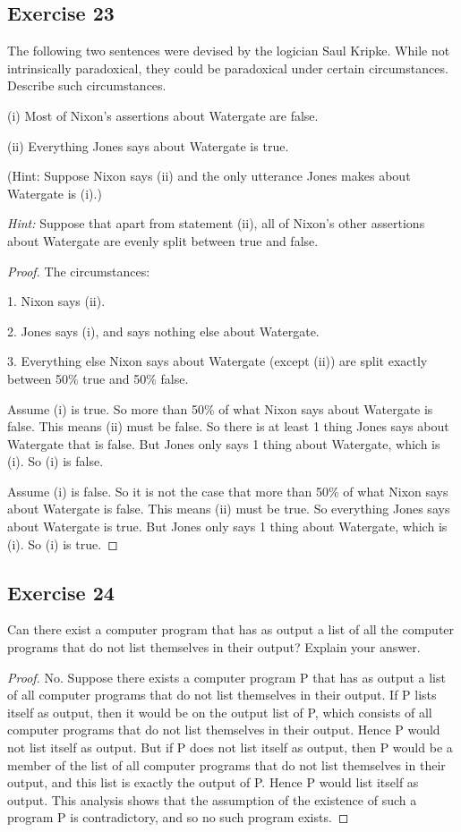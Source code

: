 \documentclass[14pt]{extarticle}
\begin{document}
\subsection{Exercise 23}
The following two sentences were devised by the logician Saul Kripke. While not intrinsically paradoxical, they 
could be paradoxical under certain circumstances. Describe such circumstances.

(i) Most of Nixon’s assertions about Watergate are false.

(ii) Everything Jones says about Watergate is true.

(Hint: Suppose Nixon says (ii) and the only utterance Jones makes about Watergate is (i).)

{\it Hint:} Suppose that apart from statement (ii), all of
Nixon’s other assertions about Watergate are evenly split 
between true and false.

\begin{proof}
The circumstances:

1. Nixon says (ii).

2. Jones says (i), and says nothing else about Watergate.

3. Everything else Nixon says about Watergate (except (ii)) are split exactly between 50\% true and 50\% false.

Assume (i) is true. So more than 50\% of what Nixon says about Watergate is false. This means (ii) must be false.
So there is at least 1 thing Jones says about Watergate that is false. But Jones only says 1 thing about Watergate,
which is (i). So (i) is false.

Assume (i) is false. So it is not the case that more than 50\% of what Nixon says about Watergate is false. This means (ii) must be true. So everything Jones says about Watergate is true. But Jones only says 1 thing about Watergate, which is (i). So (i) is true.
\end{proof}

\subsection{Exercise 24}
Can there exist a computer program that has as output a list of all the computer programs that do not list 
themselves in their output? Explain your answer.

\begin{proof}
No. Suppose there exists a computer program P that has as output a list of all computer programs that do not list 
themselves in their output. If P lists itself as output, then it would be on the output list of P, which consists of 
all computer programs that do not list themselves in their output. Hence P would not list itself as output. But if P 
does not list itself as output, then P would be a member of the list of all computer programs that do not list 
themselves in their output, and this list is exactly the output of P. Hence P would list itself as output. This 
analysis shows that the assumption of the existence of such a program P is contradictory, and so no such program exists.
\end{proof}
\end{document}
